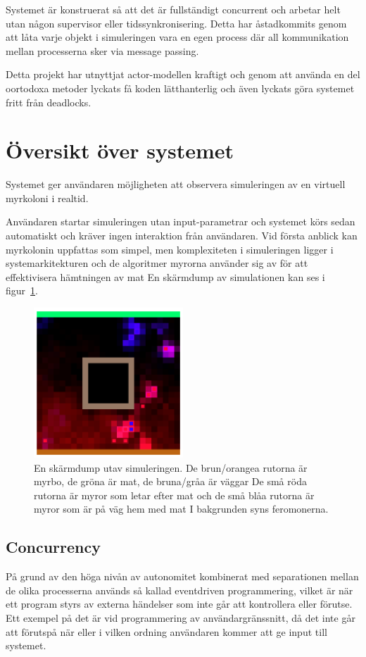 \documentclass[12pt]{article}
\begin{document}
Systemet är konstruerat så att det är fullständigt concurrent och arbetar helt utan någon supervisor eller tidssynkronisering.
Detta har åstadkommits genom att låta varje objekt i simuleringen vara en egen process där all kommunikation mellan processerna sker via message passing.

Detta projekt har utnyttjat actor-modellen kraftigt och genom att använda en del oortodoxa metoder lyckats få koden lätthanterlig och även lyckats göra systemet fritt från deadlocks.

\section{Översikt över systemet}
Systemet ger användaren möjligheten att observera simuleringen av en virtuell myrkoloni i realtid.

Användaren startar simuleringen utan input-parametrar och systemet körs sedan automatiskt och kräver ingen interaktion från användaren.
Vid första anblick kan myrkolonin uppfattas som simpel,
men komplexiteten i simuleringen ligger i systemarkitekturen och de algoritmer myrorna använder sig av för att effektivisera hämtningen av mat
En skärmdump av simulationen kan ses i figur~\ref{fig:screen-dump}.

\begin{figure}
    \centering
    \includegraphics[width=0.5\textwidth]{BugsLife-Fig1.png}
    \caption{En skärmdump utav simuleringen.
    De brun/orangea rutorna är myrbo,
    de gröna är mat,
    de bruna/gråa är väggar
    De små röda rutorna är myror som letar efter mat och de små blåa rutorna är myror som är på väg hem med mat
    I bakgrunden syns feromonerna.}
    \label{fig:screen-dump}
\end{figure}

\subsection{Concurrency}
På grund av den höga nivån av autonomitet kombinerat med separationen mellan de olika processerna används så kallad eventdriven programmering,
vilket är när ett program styrs av externa händelser som inte går att kontrollera eller förutse.
Ett exempel på det är vid programmering av användargränssnitt,
då det inte går att förutspå när eller i vilken ordning användaren kommer att ge input till systemet.
\end{document}
